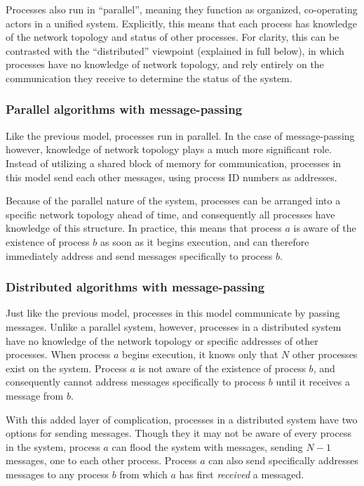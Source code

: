 \documentclass[12pt]{article}
\begin{document}
Processes also run in ``parallel'', meaning they function as organized,
co-operating actors in a unified system. Explicitly, this means that
each process has knowledge of the network topology and status of other processes.
For clarity, this can be contrasted with the ``distributed'' viewpoint (explained
in full below), in which processes have no knowledge of network topology, and rely
entirely on the communication they receive to determine the status of the system.

\subsubsection{Parallel algorithms with message-passing}
Like the previous model, processes run in parallel. In the case of message-passing however,
knowledge of network topology plays a much more significant role. Instead of utilizing
a shared block of memory for communication, processes in this model send each other
messages, using process ID numbers as addresses.

Because of the parallel nature
of the system, processes can be arranged into a specific network topology ahead of
time, and consequently all processes have knowledge of this structure.
In practice, this means that process $a$ is aware of the existence of process $b$
as soon as it begins execution, and can therefore immediately address and send messages
specifically to process $b$.

\subsubsection{Distributed algorithms with message-passing}
Just like the previous model, processes in this model communicate by passing messages.
Unlike a parallel system, however, processes in a distributed system have no knowledge
of the network topology or specific addresses of other processes. When process
$a$ begins execution, it knows only that $N$ other processes exist on the system.
Process $a$ is not aware of the existence of process $b$, and consequently
cannot address messages specifically to process $b$ until it receives a message from $b$.

With this added layer of complication, processes in a distributed system have two options
for sending messages. Though they it may not be aware of every process in the system,
process $a$ can flood the system with messages, sending $N - 1$ messages, one to each
other process. Process $a$ can also send specifically addresses messages
to any process $b$ from which $a$ has first \textit{received} a messaged.
\end{document}
